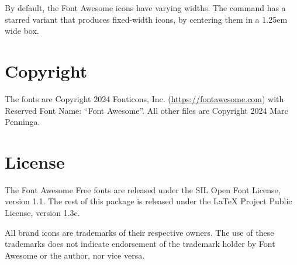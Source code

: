 \documentclass[10pt, a4paper]{ltxdoc}
\begin{document}
By default, the Font Awesome icons have varying widths. \DescribeMacro{\fa*}The  command has a starred variant  that produces fixed-width icons, by centering them in a 1.25em wide box.


\section{Copyright}
The fonts are Copyright 2024 Fonticons, Inc. (\url{https://fontawesome.com}) with Reserved Font Name: ``Font Awesome''.
All other files are Copyright 2024 Marc Penninga.


\section*{License}
The Font Awesome Free fonts are released under the SIL Open Font License, version 1.1.
The rest of this package is released under the LaTeX Project Public License, version 1.3c.

All brand icons are trademarks of their respective owners.
The use of these trademarks does not indicate endorsement of the trademark holder by Font Awesome or the author, nor vice versa.


\newpage
{}
{}


\newpage
{}
{}


\end{document}
